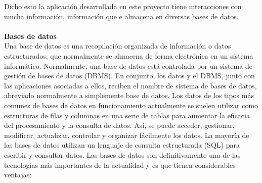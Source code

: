 \documentclass[12pt,onehalfspacing]{report}
\begin{document}
Dicho esto la aplicación desarrollada en este proyecto tiene interacciones con mucha información, información que e almacena en diversas bases de datos.\\\\
\textbf{Bases de datos}\\
Una base de datos es una recopilación organizada de información o datos estructurados, que normalmente se almacena de forma electrónica en un sistema informático. Normalmente, una base de datos está controlada por un sistema de gestión de bases de datos (DBMS). En conjunto, los datos y el DBMS, junto con las aplicaciones asociadas a ellos, reciben el nombre de sistema de bases de datos, abreviado normalmente a simplemente base de datos.
Los datos de los tipos más comunes de bases de datos en funcionamiento actualmente se suelen utilizar como estructuras de filas y columnas en una serie de tablas para aumentar la eficacia del procesamiento y la consulta de datos. Así, se puede acceder, gestionar, modificar, actualizar, controlar y organizar fácilmente los datos. La mayoría de las bases de datos utilizan un lenguaje de consulta estructurada (SQL) para escribir y consultar datos.
Las bases de datos son definitivamente una de las tecnologías más importantes de la actualidad y es que tienen considerables ventajas:
\end{document}

